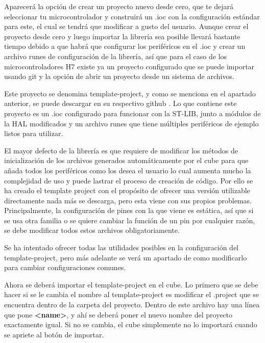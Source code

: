 \documentclass{report}
\begin{document}
Aparecerá la opción de crear un proyecto nuevo desde cero, que te dejará seleccionar tu microcontrolador y construirá un .ioc con la configuración estándar para este, el cual se tendrá que modificar a gusto del usuario. Aunque crear el proyecto desde cero y luego importar la librería sea posible llevará bastante tiempo debido a que habrá que configurar los periféricos en el .ioc y crear un archivo runes de configuración de la librería, así que para el caso de los microcontroladores H7 existe ya un proyecto configurado que se puede importar usando git y la opción de abrir un proyecto desde un sistema de archivos. \par \vspace{0.3 cm}

Este proyecto se denomina template-project, y como se menciona en el apartado anterior, se puede descargar en su respectivo github \cite{web:github:templateproject}. Lo que contiene este proyecto es un .ioc configurado para funcionar con la ST-LIB, junto a módulos de la HAL modificados y un archivo runes que tiene múltiples periféricos de ejemplo listos para utilizar. \par
El mayor defecto de la librería es que requiere de modificar los métodos de inicialización de los archivos generados automáticamente por el cube para que añada todos los periféricos como los desea el usuario lo cual aumenta mucho la complejidad de uso y puede lastrar el proceso de creación de código. Por ello se ha creado el template project con el propósito de ofrecer una versión utilizable directamente nada más se descarga, pero esta viene con sus propios problemas. Principalmente, la configuración de pines con la que viene es estática, así que si se usa otra familia o se quiere cambiar la función de un pin por cualquier razón, se debe modificar todos estos archivos obligatoriamente. \par
Se ha intentado ofrecer todas las utilidades posibles en la configuración del template-project, pero más adelante se verá un apartado de como modificarlo para cambiar configuraciones comunes. \par \vspace{0.3 cm}

Ahora se deberá importar el template-project en el cube. Lo primero que se debe hacer si se le cambia el nombre al template-project es modificar el .project que se encuentra dentro de la carpeta del proyecto. Dentro de este archivo hay una línea que pone \textbf{<name>}, y ahí se deberá poner el nuevo nombre del proyecto exactamente igual. Si no se cambia, el cube simplemente no lo importará cuando se apriete al botón de importar. \par \vspace{0.3 cm}
\end{document}
